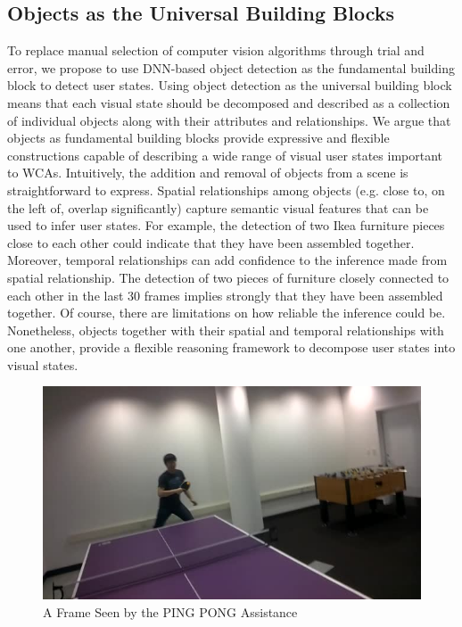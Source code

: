 \subsection{Objects as the Universal Building Blocks}

To replace manual selection of computer vision algorithms through trial and
error, we propose to use DNN-based object detection as the fundamental building
block to detect user states. Using object detection as the universal building
block means that each visual state should be decomposed and described as a
collection of individual objects along with their attributes and relationships.
We argue that objects as fundamental building blocks provide expressive and
flexible constructions capable of describing a wide range of visual user states
important to WCAs. Intuitively, the addition and removal of objects from a scene
is straightforward to express. Spatial relationships among objects (e.g. close
to, on the left of, overlap significantly) capture semantic visual features that
can be used to infer user states. For example, the detection of two Ikea
furniture pieces close to each other could indicate that they have been
assembled together. Moreover, temporal relationships can add confidence to the
inference made from spatial relationship. The detection of two pieces of
furniture closely connected to each other in the last 30 frames implies strongly
that they have been assembled together. Of course, there are limitations on how
reliable the inference could be. Nonetheless, objects together with their
spatial and temporal relationships with one another, provide a flexible
reasoning framework to decompose user states into visual states.

\begin{figure}
  \centering
  \includegraphics[trim={0 0 0 0},width=.9\linewidth]{FIGS/pingpong}
	\caption{A Frame Seen by the PING PONG Assistance}
    \label{figs:pingpong-frame}
\end{figure}

